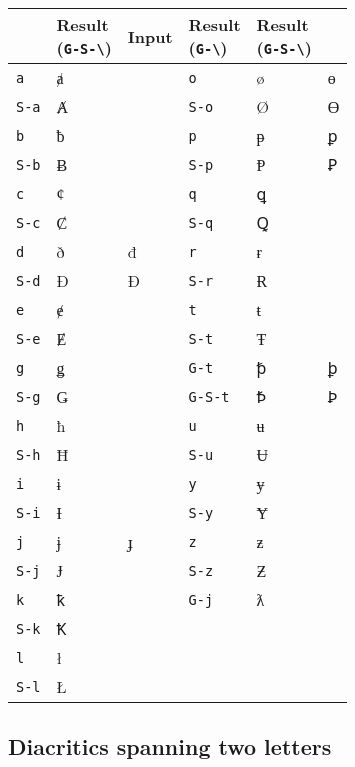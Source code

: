 \documentclass[oneside]{memoir}
\newcommand{\key}{\verb}
\newcommand{\keynv}{\texttt}
\begin{document}
\begin{table}[!b]
\begin{minipage}{0.55\paperwidth}
\begin{tabular}{lll@{\hspace{1cm}}lll}
 & \makecell{Result\\(\keynv{G-S-\textbackslash})}
& Input
 & \makecell{Result\\(\keynv{G-\textbackslash})}
 & \makecell{Result\\(\keynv{G-S-\textbackslash})} \\
\midrule
\key|a|   & ⱥ &   & \key|o|     & ø & ɵ \\
\key|S-a| & Ⱥ &   & \key|S-o|   & Ø & Ɵ \\
\key|b|   & ƀ &   & \key|p|     & ᵽ & ꝑ \\
\key|S-b| & Ƀ &   & \key|S-p|   & Ᵽ & Ꝑ \\
\key|c|   & ȼ &   & \key|q|     & ꝗ &   \\
\key|S-c| & Ȼ &   & \key|S-q|   & Ꝗ &   \\
\key|d|   & ð & đ & \key|r|     & ɍ &   \\
\key|S-d| & Ð & Đ & \key|S-r|   & Ɍ &   \\
\key|e|   & ɇ &   & \key|t|     & ŧ &   \\
\key|S-e| & Ɇ &   & \key|S-t|   & Ŧ &   \\
\key|g|   & ǥ &   & \key|G-t|   & ꝥ & ꝧ \\
\key|S-g| & Ǥ &   & \key|G-S-t| & Ꝥ & Ꝧ \\
\key|h|   & ħ &   & \key|u|     & ʉ & \\
\key|S-h| & Ħ &   & \key|S-u|   & Ʉ & \\
\key|i|   & ɨ &   & \key|y|     & ɏ & \\
\key|S-i| & Ɨ &   & \key|S-y|   & Ɏ & \\
\key|j|   & ɉ & ɟ & \key|z|     & ƶ & \\
\key|S-j| & Ɉ &   & \key|S-z|   & Ƶ & \\
\key|k|   & ꝁ &   & \key|G-j|   & ƛ & \\
\key|S-k| & Ꝁ &   &             &   & \\
\key|l|   & ł &   &             &   & \\
\key|S-l| & Ł &   &             &   & \\
\bottomrule
\end{tabular}
\end{minipage}
\end{table}

\subsection{Diacritics spanning two letters}
\label{sec:diacritics_spanning_two_letters}
\end{document}
